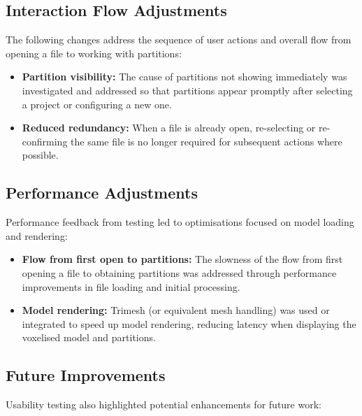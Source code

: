 \documentclass[12pt, titlepage]{article}
\begin{document}
\subsection{Interaction Flow Adjustments}

The following changes address the sequence of user actions and overall flow from opening a file to working with partitions:

\begin{itemize}
  \item \textbf{Partition visibility:} The cause of partitions not showing immediately was investigated and addressed so that partitions appear promptly after selecting a project or configuring a new one.
  \item \textbf{Reduced redundancy:} When a file is already open, re-selecting or re-confirming the same file is no longer required for subsequent actions where possible.
\end{itemize}

\subsection{Performance Adjustments}

Performance feedback from testing led to optimisations focused on model loading and rendering:

\begin{itemize}
  \item \textbf{Flow from first open to partitions:} The slowness of the flow from first opening a file to obtaining partitions was addressed through performance improvements in file loading and initial processing.
  \item \textbf{Model rendering:} Trimesh (or equivalent mesh handling) was used or integrated to speed up model rendering, reducing latency when displaying the voxelised model and partitions.
\end{itemize}

\subsection{Future Improvements}

Usability testing also highlighted potential enhancements for future work:
\end{document}
